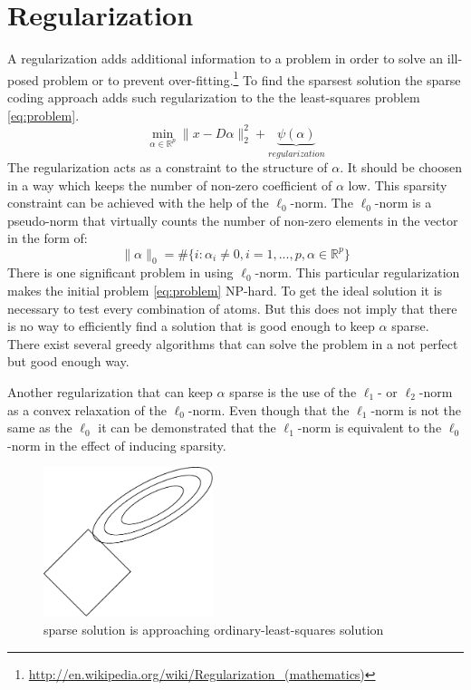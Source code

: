 \section{Regularization}
A regularization adds additional information to a problem in order to solve an
ill-posed problem or to prevent over-fitting.\footnote{\url{
http://en.wikipedia.org/wiki/Regularization_(mathematics)}}
To find the sparsest solution the sparse coding approach adds such
regularization to the the least-squares problem \ref{eq:problem}. 
\begin{equation}
\min_{\alpha\in\mathbb{R}^{p}} \lVert x - D\alpha \rVert^{2}_{2} +
\underbrace{\psi(\alpha)}_{regularization}
\end{equation}
The regularization acts as a constraint to the structure of $\alpha$. It should
be choosen in a way which keeps the number of non-zero coefficient of $\alpha$
low. This sparsity constraint can be achieved with the help of the
$\ell_0$-norm. The $\ell_0$-norm is a pseudo-norm that virtually counts the
number of non-zero elements in the vector in the form of:
\begin{equation}
\lVert\alpha\rVert_{0} = \#\{i:\alpha_i \neq 
0,i=1,...,p,\alpha\in\mathbb{R}^p\} 
\end{equation}
There is one significant problem in using $\ell_0$-norm. This particular
regularization makes the initial problem \ref{eq:problem} NP-hard. To get the
ideal solution it is necessary to test every combination of atoms. But this
does not imply that there is no way to efficiently find a solution that is good
enough to keep $\alpha$ sparse. There exist several greedy algorithms that can
solve the problem in a not perfect but good enough way. 

Another regularization that can keep $\alpha$ sparse is the use of the $\ell_1$-
or $\ell_2$-norm as a convex relaxation of the $\ell_0$-norm. Even though that
the $\ell_1$-norm is not the same as the $\ell_0$ it can be demonstrated that
the $\ell_1$-norm is equivalent to the $\ell_0$-norm in the effect of inducing
sparsity.
\begin{figure}[h]
\centering
\includegraphics[width = 0.44\textwidth]{images/regularization.pdf}
\caption{sparse solution is approaching ordinary-least-squares solution}
\label{fig:sparse}
\end{figure}

